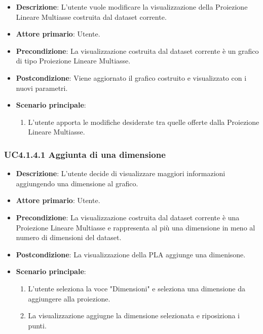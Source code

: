 \begin{itemize}
    \item \textbf{Descrizione}: L’utente vuole modificare la visualizzazione della Proiezione Lineare Multiasse
                                costruita dal dataset corrente.
	
    \item \textbf{Attore primario}: Utente.
    
    \item \textbf{Precondizione}:   La visualizzazione costruita dal dataset corrente è un grafico di tipo Proiezione Lineare Multiasse.
    \item \textbf{Postcondizione}:  Viene aggiornato il grafico costruito e visualizzato con i nuovi parametri.

	\item \textbf{Scenario principale}:
		\begin{enumerate}
            \item L'utente apporta le modifiche desiderate tra quelle offerte dalla Proiezione Lineare Multiasse.
        \end{enumerate}
\end{itemize}

\subsubsection{UC4.1.4.1 Aggiunta di una dimensione}
\label{subsec:uc4.1.4.1}
\begin{itemize}
    \item \textbf{Descrizione}: L’utente decide di visualizzare maggiori informazioni
                                aggiungendo una dimensione al grafico.

    \item \textbf{Attore primario}: Utente.
    
    \item \textbf{Precondizione}:   La visualizzazione costruita dal dataset corrente è una Proiezione Lineare Multiasse
                                    e rappresenta al più una dimensione in meno al numero di dimensioni del dataset.
    \item \textbf{Postcondizione}:  La visualizzazione della PLA aggiunge una dimenisone.

	\item \textbf{Scenario principale}:
        \begin{enumerate}
            \item L'utente seleziona la voce "Dimensioni" e seleziona una dimensione da aggiungere alla proiezione.
            \item La visualizzazione aggiugne la dimensione selezionata e riposiziona i punti.
           
        \end{enumerate}
\end{itemize}


